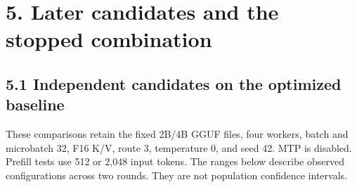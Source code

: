 \documentclass[10pt,a4paper]{article}
\begin{document}
\hypertarget{later-candidates-and-the-stopped-combination}{%
\section{5. Later candidates and the stopped
combination}\label{later-candidates-and-the-stopped-combination}}

\hypertarget{independent-candidates-on-the-optimized-baseline}{%
\subsection{5.1 Independent candidates on the optimized
baseline}\label{independent-candidates-on-the-optimized-baseline}}

These comparisons retain the fixed 2B/4B GGUF files, four workers, batch
and microbatch 32, F16 K/V, route 3, temperature 0, and seed 42. MTP is
disabled. Prefill tests use 512 or 2,048 input tokens. The ranges below
describe observed configurations across two rounds. They are not
population confidence intervals.
\end{document}
